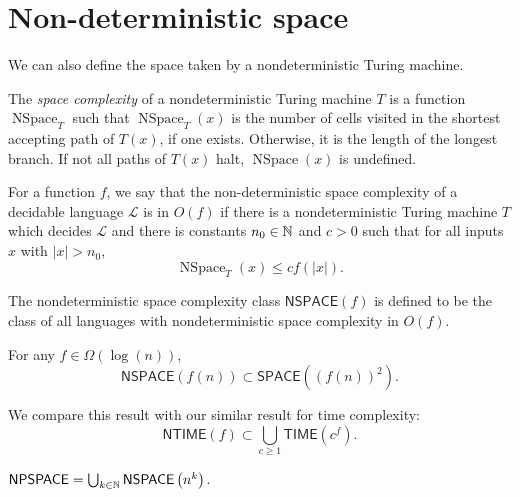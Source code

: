 \section{Non-deterministic space}

We can also define the space taken by a nondeterministic Turing machine.

\begin{definition}
	The \emph{space complexity} of a nondeterministic Turing machine $T$
	is a function $\operatorname{NSpace}_T$ such that
	$\operatorname{NSpace}_T(x)$ is the number of cells visited in the shortest
	accepting path of $T(x)$, if one exists.
	Otherwise, it is the length of the longest branch.
	If not all paths of $T(x)$ halt, $\operatorname{NSpace}(x)$ is undefined.
\end{definition}

\begin{definition}[]
	For a function $f$,
	we say that the non-deterministic space complexity of a decidable
	language $\mathcal L$ is in $O(f)$ if there is a nondeterministic
	Turing machine $T$ which decides $\mathcal L$ and there is 
	constants $n_0 \in \mathbb{N}$ and $c > 0$ such that
	for all inputs $x$ with $\left\lvert x \right\rvert > n_0$,
	\[
		\operatorname{NSpace}_T(x) 
		\leq cf\left(\left\lvert x \right\rvert\right).
	\]
\end{definition}

\begin{definition}
	The nondeterministic space complexity class
	$\mathsf{NSPACE}(f)$ is defined to be the class of all languages with 
	nondeterministic space complexity in $O(f)$.
\end{definition}

\begin{theorem}
	For any $f \in \Omega(\log(n))$,
	\[
		\mathsf{NSPACE}\left(f(n)\right) 
		\subset \mathsf{SPACE}\left((f(n))^2\right).
	\]
\end{theorem}

We compare this result with our similar result for time complexity:
\[
	\mathsf{NTIME}\left(f\right) 
	\subset \bigcup_{c \geq 1} \mathsf{TIME}\left(c^f\right).
\]

\begin{definition}
	$
		\mathsf{NPSPACE} = \bigcup_{k \in \mathbb{N}} \mathsf{NSPACE}\left(n^k\right)
	$.
\end{definition}

